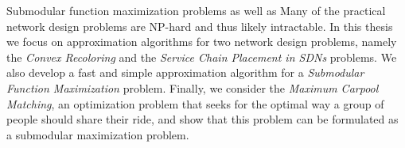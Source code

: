Submodular function maximization problems as well as Many of the practical network design problems are NP-hard and thus likely intractable. 
In this thesis we focus on approximation algorithms for two network design problems, namely the \emph{Convex Recoloring} and the \emph{Service Chain Placement in SDNs} problems. 
We also develop a fast and simple approximation algorithm for a \emph{Submodular Function Maximization} problem. 
Finally, we consider the \emph{Maximum Carpool Matching}, an optimization problem that seeks for the optimal way a group of people should share their ride, and show that this problem can be formulated as a submodular maximization problem.